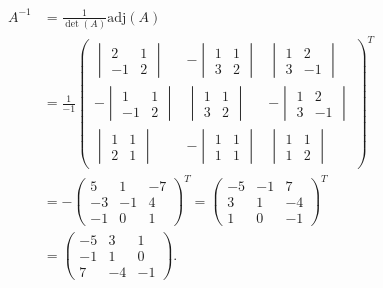 \documentclass[
  english,
  12pt,
  oneside]{book}
\theoremstyle{definition}
\theoremstyle{definition}
\theoremstyle{definition}
\theoremstyle{definition}
\theoremstyle{remark}
\begin{document}
\begin{align*}
A^{-1}
&= \frac{1}{\det(A)}\mathrm{adj}(A) \\
&= \frac{1}{-1}
\begin{pmatrix}
\begin{vmatrix}2&1\\-1&2\end{vmatrix}&-\begin{vmatrix}1&1\\3&2\end{vmatrix}&\begin{vmatrix}1&2\\3&-1\end{vmatrix}\\
-\begin{vmatrix}1&1\\-1&2\end{vmatrix}&\begin{vmatrix}1&1\\3&2\end{vmatrix}&-\begin{vmatrix}1&2\\3&-1\end{vmatrix}\\
\begin{vmatrix}1&1\\2&1\end{vmatrix}&-\begin{vmatrix}1&1\\1&1\end{vmatrix}&\begin{vmatrix}1&1\\1&2\end{vmatrix}
\end{pmatrix}^T\\
&=-\begin{pmatrix}
5&1&-7\\-3&-1&4\\-1&0&1
\end{pmatrix}^T =
\begin{pmatrix}
-5&-1&7\\3&1&-4\\1&0&-1
\end{pmatrix}^T \\
&= \begin{pmatrix}
-5&3&1\\-1&1&0\\7&-4&-1
\end{pmatrix}.
\end{align*}
\end{document}
